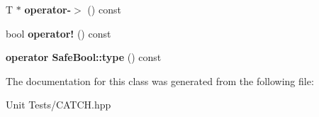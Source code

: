 \begin{DoxyCompactItemize}
\item 
T $\ast$ {\bfseries operator-\/$>$} () const \hypertarget{classCatch_1_1Ptr_afaa13250d5e0ae5a440726d5e5aa7295}{}\label{classCatch_1_1Ptr_afaa13250d5e0ae5a440726d5e5aa7295}

\item 
bool {\bfseries operator!} () const \hypertarget{classCatch_1_1Ptr_aea1a99ded6d62423ccb9173fab91b56e}{}\label{classCatch_1_1Ptr_aea1a99ded6d62423ccb9173fab91b56e}

\item 
{\bfseries operator Safe\+Bool\+::type} () const \hypertarget{classCatch_1_1Ptr_a27234c04feec43ffe0fd08e045557448}{}\label{classCatch_1_1Ptr_a27234c04feec43ffe0fd08e045557448}

\end{DoxyCompactItemize}


The documentation for this class was generated from the following file\+:\begin{DoxyCompactItemize}
\item 
Unit Tests/C\+A\+T\+C\+H.\+hpp\end{DoxyCompactItemize}
